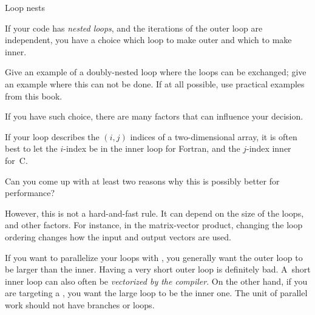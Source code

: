 \begin{comment}
  Compare this to figure~\ref{fig:l1_assoc_shift}, where we used a
  slightly longer vector length, so that locations with the same $j$ are
  no longer mapped to the same cache location. As a result, we see a
  cache miss rate around $1/8$, and a smaller number of cycles,
  corresponding to a complete reuse of the cache lines. 

  Two remarks: the cache miss numbers are in fact lower than the theory
  predicts, since the processor will use prefetch streams. Secondly, in
  figure~\ref{fig:l1_assoc_shift} we see a decreasing time with
  increasing~$m$; this is probably due to a progressively more
  favorable balance between load and store operations. Store operations
  are more expensive than loads, for various reasons.
\end{comment}


 {Loop nests}

If your code has \emph{nested loops}, and the iterations of the outer
loop are independent, you have a choice which loop to make outer and
which to make inner.

\begin{exercise}
  Give an example of a doubly-nested loop where the loops can be
  exchanged; give an example where this can not be done. If at all
  possible, use practical examples from this book.
\end{exercise}

If you have such choice, there are many factors that can influence
your decision.

%
If your loop describes the $(i,j)$ indices of a two-dimensional array,
it is often best to let the $i$-index be in the inner loop for
Fortran, and the $j$-index inner for~C.

\begin{exercise}
  Can you come up with at least two reasons why this is possibly better for performance?
\end{exercise}

However, this is not a hard-and-fast rule. It can depend on the size
of the loops, and other factors. For instance, in the matrix-vector
product, changing the loop ordering changes how the input and output
vectors are used.


%
If you want to parallelize your loops with , you
generally want the outer loop to be larger than the inner. Having a
very short outer loop is definitely bad. A~short inner loop can also
often be \emph{vectorized by the
  compiler}.
On the other hand, if you are targeting a , you want the
large loop to be the inner one. The unit of parallel work should not have branches
or loops.

